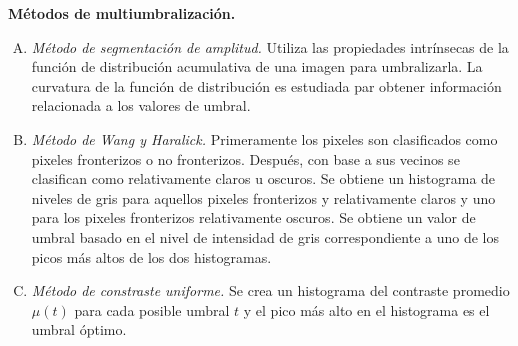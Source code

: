 \documentclass[12pt]{report}
\begin{document}
\textbf{ Métodos de multiumbralización.}
\begin{enumerate}[A.]
\item \textit{Método de segmentación de amplitud.} Utiliza las propiedades intrínsecas de la función de distribución acumulativa de una imagen para umbralizarla. La curvatura de la función de distribución es estudiada par obtener información relacionada a los valores de umbral.

\item \textit{Método de Wang y Haralick.} Primeramente los pixeles son clasificados como pixeles fronterizos o no fronterizos. Después, con base a sus vecinos se clasifican como relativamente claros u oscuros. Se obtiene un histograma de niveles de gris para aquellos pixeles fronterizos y relativamente claros y uno para los pixeles fronterizos relativamente oscuros. Se obtiene un valor de umbral basado en el nivel de intensidad de gris correspondiente a uno de los picos más altos de los dos histogramas.

\item \textit{Método de constraste uniforme.} Se crea un histograma del contraste promedio $\mu(t)$ para cada posible umbral $t$ y el pico más alto en el histograma es el umbral óptimo.
\end{enumerate}




\end{document}
